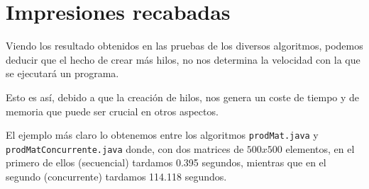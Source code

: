 \documentclass[12pt,letterpaper]{article}
\begin{document}
\newpage
\section{Impresiones recabadas}

Viendo los resultado obtenidos en las pruebas de los diversos algoritmos, podemos deducir que el hecho de crear más hilos, no nos determina la velocidad con la que se ejecutará un programa.

Esto es así, debido a que la creación de hilos, nos genera un coste de tiempo y de memoria que puede ser crucial en otros aspectos.

El ejemplo más claro lo obtenemos entre los algoritmos \texttt{prodMat.java} y\\ \texttt{prodMatConcurrente.java} donde, con dos matrices de $500x500$ elementos, en el primero de ellos (secuencial) tardamos 0.395 segundos, mientras que en el segundo (concurrente) tardamos 114.118 segundos.
\end{document}
